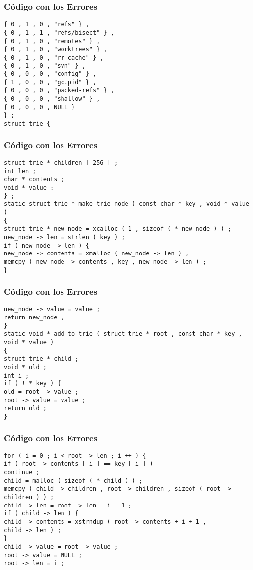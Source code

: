 \documentclass{beamer}
\begin{document}
\begin{frame}[fragile]
\frametitle{C\'odigo con los Errores}
\begin{verbatim}
{ 0 , 1 , 0 , "refs" } , 
{ 0 , 1 , 1 , "refs/bisect" } , 
{ 0 , 1 , 0 , "remotes" } , 
{ 0 , 1 , 0 , "worktrees" } , 
{ 0 , 1 , 0 , "rr-cache" } , 
{ 0 , 1 , 0 , "svn" } , 
{ 0 , 0 , 0 , "config" } , 
{ 1 , 0 , 0 , "gc.pid" } , 
{ 0 , 0 , 0 , "packed-refs" } , 
{ 0 , 0 , 0 , "shallow" } , 
{ 0 , 0 , 0 , NULL } 
} ; 
struct trie { 
\end{verbatim}
\end{frame}
\begin{frame}[fragile]
\frametitle{C\'odigo con los Errores}
\begin{verbatim}
struct trie * children [ 256 ] ; 
int len ; 
char * contents ; 
void * value ; 
} ; 
static struct trie * make_trie_node ( const char * key , void * value ) 
{ 
struct trie * new_node = xcalloc ( 1 , sizeof ( * new_node ) ) ; 
new_node -> len = strlen ( key ) ; 
if ( new_node -> len ) { 
new_node -> contents = xmalloc ( new_node -> len ) ; 
memcpy ( new_node -> contents , key , new_node -> len ) ; 
} 
\end{verbatim}
\end{frame}
\begin{frame}[fragile]
\frametitle{C\'odigo con los Errores}
\begin{verbatim}
new_node -> value = value ; 
return new_node ; 
} 
static void * add_to_trie ( struct trie * root , const char * key , void * value ) 
{ 
struct trie * child ; 
void * old ; 
int i ; 
if ( ! * key ) { 
old = root -> value ; 
root -> value = value ; 
return old ; 
} 
\end{verbatim}
\end{frame}
\begin{frame}[fragile]
\frametitle{C\'odigo con los Errores}
\begin{verbatim}
for ( i = 0 ; i < root -> len ; i ++ ) { 
if ( root -> contents [ i ] == key [ i ] ) 
continue ; 
child = malloc ( sizeof ( * child ) ) ; 
memcpy ( child -> children , root -> children , sizeof ( root -> children ) ) ; 
child -> len = root -> len - i - 1 ; 
if ( child -> len ) { 
child -> contents = xstrndup ( root -> contents + i + 1 , 
child -> len ) ; 
} 
child -> value = root -> value ; 
root -> value = NULL ; 
root -> len = i ; 
\end{verbatim}
\end{frame}
\end{document}
